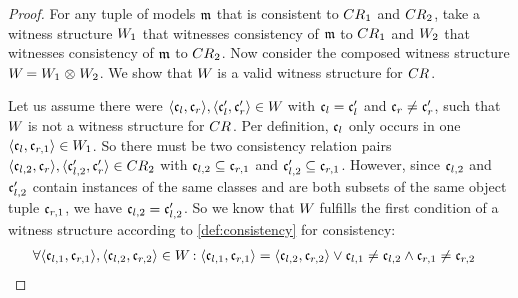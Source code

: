 \begin{proof}
    For any tuple of models $\modeltuple{m}$ that is consistent to $\consistencyrelation{CR}{1}$ and $\consistencyrelation{CR}{2}$, take a witness structure $\consistencyrelation{W}{1}$ that witnesses consistency of $\modeltuple{m}$ to $\consistencyrelation{CR}{1}$ and $\consistencyrelation{W}{2}$ that witnesses consistency of $\modeltuple{m}$ to $\consistencyrelation{CR}{2}$.
    Now consider the composed witness structure $\consistencyrelation{W}{} = \consistencyrelation{W}{1} \concat \consistencyrelation{W}{2}$.
    We show that $\consistencyrelation{W}{}$ is a valid witness structure for $\consistencyrelation{CR}{}$.

    Let us assume there were $\tupled{\conditionelement{c}{l}, \conditionelement{c}{r}}, \tupled{\conditionelement{c}{l}', \conditionelement{c}{r}'} \in \consistencyrelation{W}{}$ with $\conditionelement{c}{l} = \conditionelement{c}{l}'$ and $\conditionelement{c}{r} \neq \conditionelement{c}{r}'$, such that $\consistencyrelation{W}{}$ is not a witness structure for $\consistencyrelation{CR}{}$.
    Per definition, $\conditionelement{c}{l}$ only occurs in one $\tupled{\conditionelement{c}{l}, \conditionelement{c}{r,1}} \in \consistencyrelation{W}{1}$.
    So there must be two consistency relation pairs $\tupled{\conditionelement{c}{l,2}, \conditionelement{c}{r}}, \tupled{\conditionelement{c}{l,2}', \conditionelement{c}{r}'} \in \consistencyrelation{CR}{2}$ with $\conditionelement{c}{l,2} \subseteq \conditionelement{c}{r,1}$ and $\conditionelement{c}{l,2}' \subseteq \conditionelement{c}{r,1}$.
    However, since $\conditionelement{c}{l,2}$ and $\conditionelement{c}{l,2}'$ contain instances of the same classes and are both subsets of the same object tuple $\conditionelement{c}{r,1}$, we have $\conditionelement{c}{l,2} = \conditionelement{c}{l,2}'$.
    So we know that $\consistencyrelation{W}{}$ fulfills the first condition of a witness structure according to \autoref{def:consistency} for consistency:
    \begin{align*}
        &
        \forall \tupled{\conditionelement{c}{l,1}, \conditionelement{c}{r,1}}, \tupled{\conditionelement{c}{l,2}, \conditionelement{c}{r,2}} \in \consistencyrelation{W}{} : %
        \tupled{\conditionelement{c}{l,1}, \conditionelement{c}{r,1}} = \tupled{\conditionelement{c}{l,2}, \conditionelement{c}{r,2}} \lor \conditionelement{c}{l,1} \neq \conditionelement{c}{l,2} \land \conditionelement{c}{r,1} \neq \conditionelement{c}{r,2}

\end{align*}
\end{proof}
